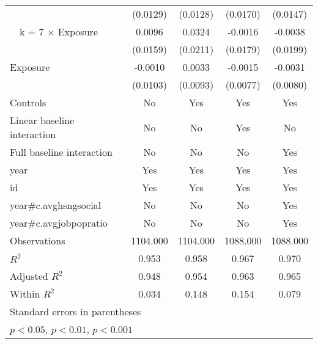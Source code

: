 {\begin{tabular}{l*{4}{c}}
                & (0.0129)         & (0.0128)         & (0.0170)         & (0.0147)         \\
\addlinespace
~~k = 7 $\times$ Exposure&   0.0096         &   0.0324         &  -0.0016         &  -0.0038         \\
                & (0.0159)         & (0.0211)         & (0.0179)         & (0.0199)         \\
\addlinespace
Exposure        &  -0.0010         &   0.0033         &  -0.0015         &  -0.0031         \\
                & (0.0103)         & (0.0093)         & (0.0077)         & (0.0080)         \\
\addlinespace
Controls        &     {No}         &    {Yes}         &    {Yes}         &    {Yes}         \\
\addlinespace
Linear baseline interaction &     {No}         &     {No}         &    {Yes}         &     {No}         \\
\addlinespace
Full baseline interaction&     {No}         &     {No}         &     {No}         &    {Yes}         \\
\addlinespace
year            &    {Yes}         &    {Yes}         &    {Yes}         &    {Yes}         \\
\addlinespace
id              &    {Yes}         &    {Yes}         &    {Yes}         &    {Yes}         \\
\addlinespace
year#c.avghsngsocial&     {No}         &     {No}         &     {No}         &    {Yes}         \\
\addlinespace
year#c.avgjobpopratio&     {No}         &     {No}         &     {No}         &    {Yes}         \\
\midrule
Observations    & 1104.000         & 1104.000         & 1088.000         & 1088.000         \\
\(R^{2}\)       &    0.953         &    0.958         &    0.967         &    0.970         \\
Adjusted \(R^{2}\)&    0.948         &    0.954         &    0.963         &    0.965         \\
Within \(R^{2}\)&    0.034         &    0.148         &    0.154         &    0.079         \\
\bottomrule
\multicolumn{5}{l}{\footnotesize Standard errors in parentheses}\\
\multicolumn{5}{l}{\footnotesize \sym{*} \(p<0.05\), \sym{**} \(p<0.01\), \sym{***} \(p<0.001\)}\\
\end{tabular}
}
